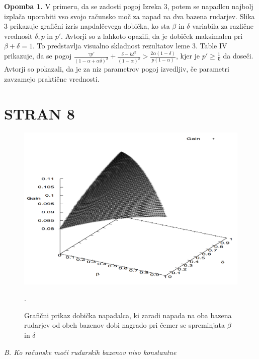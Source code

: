 \documentclass[12pt]{article}
\begin{document}
\textbf{Opomba 1.} V primeru, da se zadosti pogoj Izreka 3, potem se napadlcu najbolj izplača uporabiti vso svojo računsko moč za napad na dva bazena rudarjev. Slika 3 prikazuje grafični izris napdalčevega dobička, ko sta $\beta$ in $\delta$ variabila za različne vrednosit $\delta, p $ in $p'$. Avtorji so z lahkoto opazili, da je dobiček maksimalen pri $\beta + \delta = 1$. To predstavlja visualno skladnost rezultatov leme 3.
\newline
\newline
Table IV prikazuje, da se pogoj $\frac{\gamma p'}{(1 - \alpha + \alpha\delta)^2} + \frac{\delta - k\delta^2}{(1 - \alpha)^2} > \frac{2\alpha(1 - \delta)}{p(1 - \alpha)}$, kjer je $p' \geq \frac{1}{k}$ da doseči. Avtorji so pokazali, da je za niz parametrov pogoj izvedljiv, če parametri zavzamejo praktične vrednosti. 

\section{STRAN 8}

\begin{figure}
  \includegraphics[scale=0.35]{image8.png}
  \caption{Grafični prikaz dobička napadalca, ki zaradi napada na oba bazena rudarjev od obeh bazenov dobi nagrado pri čemer se spreminjata $\beta$ in $\delta$}.
  \label{fig:boat1}
\end{figure}


\textit{B. Ko računske moči rudarskih bazenov niso konstantne}
\end{document}
